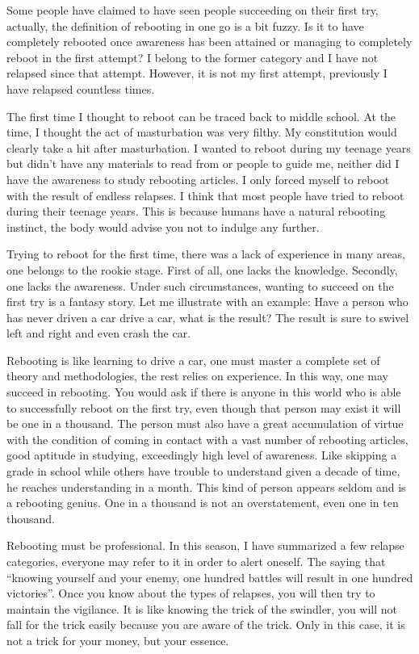 \documentclass[
]{book}
\begin{document}
Some people have claimed to have seen people succeeding on their first try, actually, the definition of rebooting in one go is a bit fuzzy. Is it to have completely rebooted once awareness has been attained or managing to completely reboot in the first attempt? I belong to the former category and I have not relapsed since that attempt. However, it is not my first attempt, previously I have relapsed countless times.

The first time I thought to reboot can be traced back to middle school. At the time, I thought the act of masturbation was very filthy. My constitution would clearly take a hit after masturbation. I wanted to reboot during my teenage years but didn't have any materials to read from or people to guide me, neither did I have the awareness to study rebooting articles. I only forced myself to reboot with the result of endless relapses. I think that most people have tried to reboot during their teenage years. This is because humans have a natural rebooting instinct, the body would advise you not to indulge any further.

Trying to reboot for the first time, there was a lack of experience in many areas, one belongs to the rookie stage. First of all, one lacks the knowledge. Secondly, one lacks the awareness. Under such circumstances, wanting to succeed on the first try is a fantasy story. Let me illustrate with an example: Have a person who has never driven a car drive a car, what is the result? The result is sure to swivel left and right and even crash the car.

Rebooting is like learning to drive a car, one must master a complete set of theory and methodologies, the rest relies on experience. In this way, one may succeed in rebooting. You would ask if there is anyone in this world who is able to successfully reboot on the first try, even though that person may exist it will be one in a thousand. The person must also have a great accumulation of virtue with the condition of coming in contact with a vast number of rebooting articles, good aptitude in studying, exceedingly high level of awareness. Like skipping a grade in school while others have trouble to understand given a decade of time, he reaches understanding in a month. This kind of person appears seldom and is a rebooting genius. One in a thousand is not an overstatement, even one in ten thousand.

Rebooting must be professional. In this season, I have summarized a few relapse categories, everyone may refer to it in order to alert oneself. The saying that ``knowing yourself and your enemy, one hundred battles will result in one hundred victories''. Once you know about the types of relapses, you will then try to maintain the vigilance. It is like knowing the trick of the swindler, you will not fall for the trick easily because you are aware of the trick. Only in this case, it is not a trick for your money, but your essence.
\end{document}
